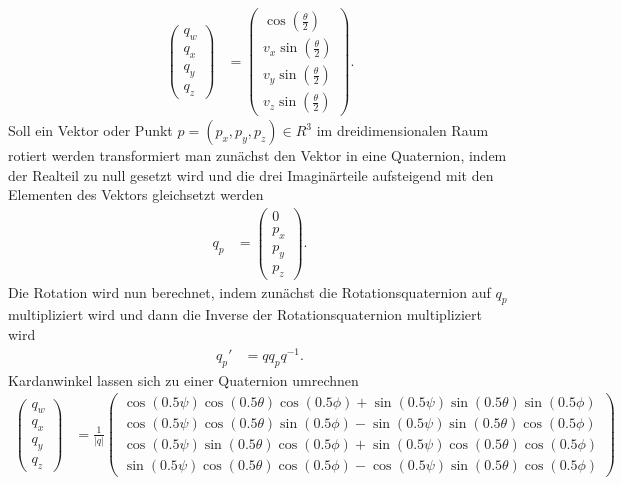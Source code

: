 \begin{align}
	\begin{pmatrix}
		q_w\\
		q_x\\
		q_y\\
		q_z
	\end{pmatrix}
	&= \begin{pmatrix}
		\cos\left (\frac{\theta}{2}\right )\\
		v_x \sin \left (\frac{\theta}{2}\right )\\
		v_y \sin \left (\frac{\theta}{2}\right )\\
		v_z \sin \left (\frac{\theta}{2}\right )
	\end{pmatrix}.
\end{align}
Soll ein Vektor oder Punkt $p = (p_x, p_y, p_z) \in R^3$ im dreidimensionalen Raum rotiert werden transformiert man zunächst den Vektor in eine Quaternion, indem der Realteil zu null gesetzt wird und die drei Imaginärteile aufsteigend mit den Elementen des Vektors gleichsetzt werden
\begin{align}
	q_p &= \begin{pmatrix}
		0\\
		p_x\\
		p_y\\
		p_z
	\end{pmatrix}.
\end{align}
Die Rotation wird nun berechnet, indem zunächst die Rotationsquaternion auf $q_p$ multipliziert wird und dann die Inverse der Rotationsquaternion multipliziert wird
\begin{align}
	q_p' &= qq_pq^{-1}.
\end{align}
Kardanwinkel lassen sich zu einer Quaternion umrechnen
\begin{align*}
	\begin{pmatrix}
		q_w\\
		q_x\\
		q_y\\
		q_z
	\end{pmatrix}
	&=
	\frac{1}{|q|}
	\begin{pmatrix}
		\cos(0.5\psi)\cos(0.5\theta)\cos(0.5\phi) + \sin(0.5\psi)\sin(0.5\theta)\sin(0.5\phi)\\
		\cos(0.5\psi)\cos(0.5\theta)\sin(0.5\phi) - \sin(0.5\psi)\sin(0.5\theta)\cos(0.5\phi)\\
		\cos(0.5\psi)\sin(0.5\theta)\cos(0.5\phi) + \sin(0.5\psi)\cos(0.5\theta)\cos(0.5\phi)\\
		\sin(0.5\psi)\cos(0.5\theta)\cos(0.5\phi) - \cos(0.5\psi)\sin(0.5\theta)\cos(0.5\phi)
	\end{pmatrix}
\end{align*}
